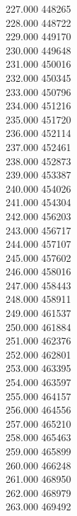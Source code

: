 { 227.000	448265 \\
 228.000	448722 \\
 229.000	449170 \\
 230.000	449648 \\
 231.000	450016 \\
 232.000	450345 \\
 233.000	450796 \\
 234.000	451216 \\
 235.000	451720 \\
 236.000	452114 \\
 237.000	452461 \\
 238.000	452873 \\
 239.000	453387 \\
 240.000	454026 \\
 241.000	454304 \\
 242.000	456203 \\
 243.000	456717 \\
 244.000	457107 \\
 245.000	457602 \\
 246.000	458016 \\
 247.000	458443 \\
 248.000	458911 \\
 249.000	461537 \\
 250.000	461884 \\
 251.000	462376 \\
 252.000	462801 \\
 253.000	463395 \\
 254.000	463597 \\
 255.000	464157 \\
 256.000	464556 \\
 257.000	465210 \\
 258.000	465463 \\
 259.000	465899 \\
 260.000	466248 \\
 261.000	468950 \\
 262.000	468979 \\
 263.000	469492 \\
}
